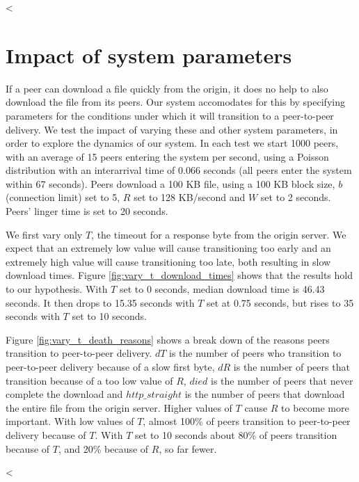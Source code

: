 <%

\section{Impact of system parameters}

If a peer can download a file quickly from the origin, it does no help to also download the file from its
peers. Our system accomodates for this by specifying parameters for the conditions under which it will 
transition to a peer-to-peer delivery. We test the impact of varying these and other system parameters, in order 
to explore the dynamics of our system. In each test we start 1000 peers, with an average of 15 peers entering 
the system per second, using a Poisson distribution with an interarrival time of 0.066 seconds (all peers enter the system within 67 seconds). 
Peers download a 100 KB file, using a 100 KB block size, $b$ (connection limit) set to 5, $R$ set to 128 KB/second and $W$ set to 2 seconds.
Peers' linger time is set to 20 seconds.

We first vary only $T$, the timeout for a response byte from the origin server. We expect that an extremely low value 
will cause transitioning too early and an extremely high value 
will cause transitioning too late, both resulting in slow download times. Figure \ref{fig:vary_t_download_times} shows that 
the results hold to our hypothesis. With $T$ set to 0 seconds, median download time is 46.43 seconds. It then drops to 15.35 seconds with $T$ set at 0.75 seconds, 
but rises to 35 seconds with $T$ set to 10 seconds.

Figure \ref{fig:vary_t_death_reasons} shows a break down of the reasons peers transition to peer-to-peer delivery.  $dT$ is the number
of peers who transition to peer-to-peer delivery because of a slow first byte, $dR$ is the number of
peers that transition because of a too low value of $R$, $died$ is the number of peers that never complete the download and $http\_straight$ is the number of peers
that download the entire file from the origin server.
Higher values of $T$ cause $R$ to become more important.  With low values of $T$, almost 100\% of peers transition to peer-to-peer delivery because of $T$. 
With $T$ set to 10 seconds about 80\% of peers transition because of $T$, and 20\% because of $R$, so far fewer.

<%

